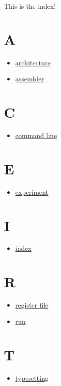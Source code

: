\documentclass[11pt]{article}
\date{\today}
\title{}
\begin{document}
This is the index!

\section{A}
\label{sec:orgc61ad33}
\begin{itemize}
\item \href{Sigma16UserGuide.org}{architecture}
\item \href{Sigma16UserGuide.org}{assembler}
\end{itemize}
\section{C}
\label{sec:org478ea6d}
\begin{itemize}
\item \href{Sigma16UserGuide.org}{command line}
\end{itemize}
\section{E}
\label{sec:orgff1f317}
\begin{itemize}
\item \href{Test.org}{experiment}
\end{itemize}
\section{I}
\label{sec:orgbd1a52d}
\begin{itemize}
\item \href{Test.org}{index}
\end{itemize}
\section{R}
\label{sec:orgb395ed0}
\begin{itemize}
\item \href{Sigma16UserGuide.org}{register file}
\item \href{Sigma16UserGuide.org}{run}
\end{itemize}
\section{T}
\label{sec:org2160cbe}
\begin{itemize}
\item \href{Test.org}{typesetting}
\end{itemize}
\end{document}

